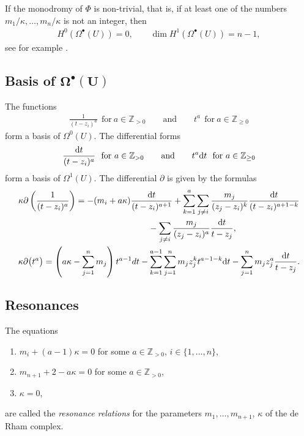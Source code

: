 If the monodromy of $\Phi$ is non-trivial, that is, if at least one of the numbers $m_1/\kappa, \dots, m_n/\kappa$ is not an integer, then
\begin{gather*}
H^0(\Omega^{\bullet}(U))=0,\qquad \dim H^1(\Omega^{\bullet}(U))=n-1,
\end{gather*}
see for example \cite{STV}.

\subsection[Basis of $\Omega^{\bullet}(U)$]{Basis of $\boldsymbol{\Omega^{\bullet}(U)}$} \label{Basis of Omega}

The functions
\begin{gather*}
\frac1{(t-z_i)^{a}}\ \ \text{for}\ a\in{\mathbb Z}_{>0} \qquad\text{and}\qquad t^a\ \ \text{for}\ a\in{\mathbb Z}_{\geq 0}
\end{gather*}
form a basis of $\Omega^0(U)$. The differential forms
\begin{gather*}
\frac{{\rm d}t}{(t-z_i)^a}\ \ \text{for}\ a\in{\mathbb Z}_{>0} \qquad \text{and}\qquad t^a{\rm d}t\ \ \text{for}\ a\in{\mathbb Z}_{\geq 0}
\end{gather*}
form a basis of $\Omega^1(U)$. The differential $\partial$ is given by the formulas
\begin{gather}
\kappa \partial\left(\frac1{(t-z_i)^{a}}\right) = -(m_i+a\kappa)\frac{{\rm d} t}{(t-z_i)^{a+1}}
+ \sum_{k=1}^a\sum_{j\neq i} \frac{m_j}{(z_j-z_i)^k} \frac{{\rm d}t}{(t-z_i)^{a+1-k}} \nonumber\\
\hphantom{\kappa \partial\left(\frac1{(t-z_i)^{a}}\right) =}{} -\sum_{j\neq i}\frac{ m_j}{(z_j-z_i)^a} \frac{{\rm d}t}{t-z_j}, \label{bff} \\
\kappa \partial\big(t^a\big) = \left(a\kappa -\sum_{j=1}^n m_j\right)t^{a-1}dt -\sum_{k=1}^{a-1} \sum_{j=1}^n m_jz_j^k t^{a-1-k}{\rm d}t-\sum_{j=1}^n m_jz_j^a \frac{{\rm d}t}{t-z_j}.\label{bfi}
\end{gather}


\subsection{Resonances}\label{reson}
The equations
\begin{enumerate}\itemsep=0pt
\item[(i)] $m_i+(a-1)\kappa=0$ for some $a\in {\mathbb Z}_{>0}$, $i\in\{1,\dots,n\}$,
\item[(ii)] $m_{n+1}+2-a\kappa=0$ for some $a\in {\mathbb Z}_{>0}$,
\item[(iii)] $\kappa=0$,
\end{enumerate}
are called the {\it resonance relations} for the parameters $m_1,\dots,m_{n+1}$, $\kappa$ of the de Rham complex.

